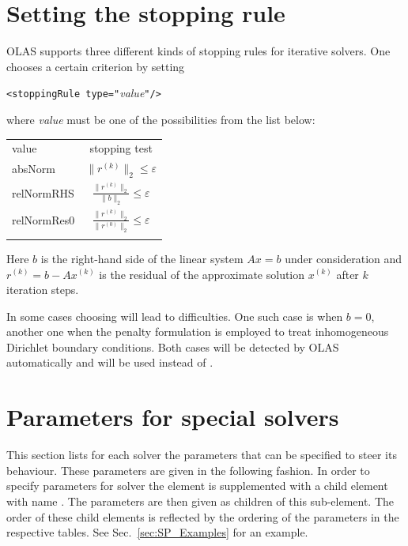 \section{Setting the stopping rule}
%
%
OLAS supports three different kinds of stopping rules for iterative solvers.
One chooses a certain criterion by setting
%
%
\begin{center}
\verb!<stoppingRule type="!\emph{value}\verb!"/>!
\end{center}
%
%
where \emph{value} must be one of the possibilities from the list below:
%
%
\begin{center}
\begin{tabular}{lc}
\hline\noalign{\smallskip}
value & stopping test \\
\noalign{\smallskip}\hline\noalign{\smallskip}
{absNorm}     & $\displaystyle\|r^{(k)}\|_2 \leqslant \varepsilon$\\
\noalign{\smallskip}\hline\noalign{\smallskip}
{relNormRHS}  & $\displaystyle\frac{\|r^{(k)}\|_2}{\|b\|_2} \leqslant
 \varepsilon$\\
\noalign{\smallskip}\hline\noalign{\smallskip}
{relNormRes0} & $\displaystyle\frac{\|r^{(k)}\|_2}{\|r^{(0)}\|_2}\leqslant
\varepsilon$\\
\noalign{\smallskip}\hline
\end{tabular}
\end{center}
%
%
Here $b$ is the right-hand side of the linear system $Ax=b$ under consideration
and $r^{(k)}=b - Ax^{(k)}$ is the residual of the approximate solution
$x^{(k)}$ after $k$ iteration steps.

In some cases choosing  will lead to difficulties. One such
case is when $b=0$, another one when the penalty formulation is employed to
treat inhomogeneous Dirichlet boundary conditions. Both cases will be detected
by OLAS automatically and  will be used instead of
.
%
%
\section{Parameters for special solvers}
%
%
This section lists for each solver the parameters that can be specified to
steer its behaviour. These parameters are given in the following fashion.
In order to specify parameters for solver  the  element
is supplemented with a child element with name . The parameters
are then given as children of this sub-element. The order of these child
elements is reflected by the ordering of the parameters in the respective
tables. See Sec.~\ref{sec:SP_Examples} for an example.


